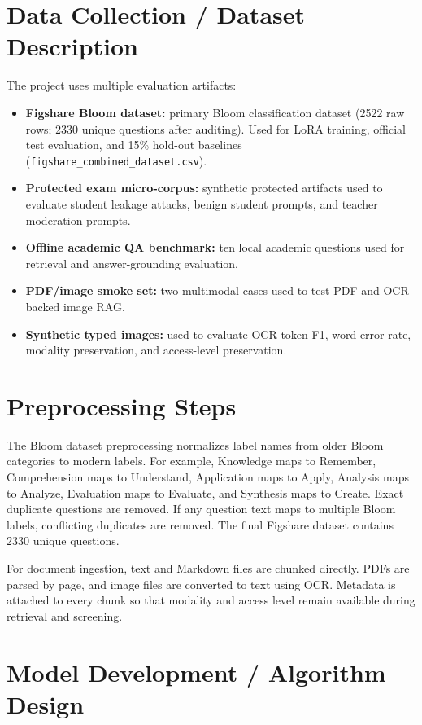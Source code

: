 \section{Data Collection / Dataset Description}

The project uses multiple evaluation artifacts:
\begin{itemize}
    \item \textbf{Figshare Bloom dataset:} primary Bloom classification dataset (2522 raw rows; 2330 unique questions after auditing). Used for LoRA training, official test evaluation, and 15\% hold-out baselines (\texttt{figshare\_combined\_dataset.csv}).
    \item \textbf{Protected exam micro-corpus:} synthetic protected artifacts used to evaluate student leakage attacks, benign student prompts, and teacher moderation prompts.
    \item \textbf{Offline academic QA benchmark:} ten local academic questions used for retrieval and answer-grounding evaluation.
    \item \textbf{PDF/image smoke set:} two multimodal cases used to test PDF and OCR-backed image RAG.
    \item \textbf{Synthetic typed images:} used to evaluate OCR token-F1, word error rate, modality preservation, and access-level preservation.
\end{itemize}

\section{Preprocessing Steps}

The Bloom dataset preprocessing normalizes label names from older Bloom categories to modern labels. For example, Knowledge maps to Remember, Comprehension maps to Understand, Application maps to Apply, Analysis maps to Analyze, Evaluation maps to Evaluate, and Synthesis maps to Create. Exact duplicate questions are removed. If any question text maps to multiple Bloom labels, conflicting duplicates are removed. The final Figshare dataset contains 2330 unique questions.

For document ingestion, text and Markdown files are chunked directly. PDFs are parsed by page, and image files are converted to text using OCR. Metadata is attached to every chunk so that modality and access level remain available during retrieval and screening.

\section{Model Development / Algorithm Design}


